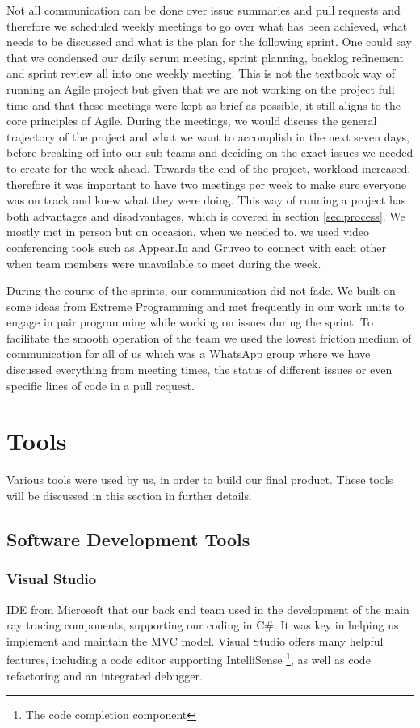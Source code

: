 \documentclass[a4paper]{report}
\begin{document}
	\par Not all communication can be done over issue summaries and pull requests and therefore we scheduled weekly meetings to go over what has been achieved, what needs to be discussed and what is the plan for the following sprint. One could say that we condensed our daily scrum meeting, sprint planning, backlog refinement and sprint review all into one weekly meeting. This is not the textbook way of running an Agile project but given that we are not working on the project full time and that these meetings were kept as brief as possible, it still aligns to the core principles of Agile. During the meetings, we would discuss the general trajectory of the project and what we want to accomplish in the next seven days, before breaking off into our sub-teams and deciding on the exact issues we needed to create for the week ahead. Towards the end of the project, workload increased, therefore it was important to have two meetings per week to make sure everyone was on track and knew what they were doing. This way of running a project has both advantages and disadvantages, which is covered in section \ref{sec:process}. We mostly met in person but on occasion, when we needed to, we used video conferencing tools such as Appear.In and Gruveo to connect with each other when team members were unavailable to meet during the week.\newline
	
	
	During the course of the sprints, our communication did not fade. We built on some ideas from Extreme Programming and met frequently in our work units to engage in pair programming while working on issues during the sprint. To facilitate the smooth operation of the team we used the lowest friction medium of communication for all of us which was a WhatsApp group where we have discussed everything from meeting times, the status of different issues or even specific lines of code in a pull request. 
	
	\section{Tools} \label{sec:tools}
	Various tools were used by us, in order to build our final product. These tools will be discussed in this section in further details.
	\subsection{Software Development Tools}
	\subsubsection{Visual Studio}
	IDE from Microsoft that our back end team used in the development of the main ray tracing components, supporting our coding in C\#. It was key in helping us implement and maintain the MVC model. Visual Studio offers many helpful features, including a code editor supporting IntelliSense \footnote{The code completion component}, as well as code refactoring and an integrated debugger.
\end{document}
